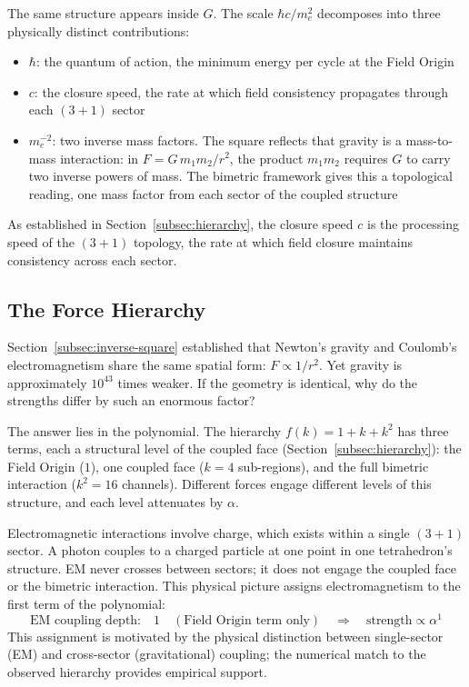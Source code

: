 \documentclass[aps,prd,preprint,superscriptaddress,showpacs,preprintnumbers,amsmath,amssymb,nofootinbib]{revtex4-2}
\begin{document}
The same structure appears inside $G$. The scale $\hbar c / m_e^2$ decomposes into three physically distinct contributions:
\begin{itemize}
\item $\hbar$: the quantum of action, the minimum energy per cycle at the Field Origin
\item $c$: the closure speed, the rate at which field consistency propagates through each $(3+1)$ sector
\item $m_e^{-2}$: two inverse mass factors. The square reflects that gravity is a mass-to-mass interaction: in $F = G\, m_1 m_2 / r^2$, the product $m_1 m_2$ requires $G$ to carry two inverse powers of mass. The bimetric framework gives this a topological reading, one mass factor from each sector of the coupled structure
\end{itemize}

As established in Section~\ref{subsec:hierarchy}, the closure speed $c$ is the processing speed of the $(3+1)$ topology, the rate at which field closure maintains consistency across each sector.

\subsection{The Force Hierarchy}
\label{subsec:hierarchy-eq}

Section~\ref{subsec:inverse-square} established that Newton's gravity and Coulomb's electromagnetism share the same spatial form: $F \propto 1/r^2$. Yet gravity is approximately $10^{43}$ times weaker. If the geometry is identical, why do the strengths differ by such an enormous factor?

The answer lies in the polynomial. The hierarchy $f(k) = 1 + k + k^2$ has three terms, each a structural level of the coupled face (Section~\ref{subsec:hierarchy}): the Field Origin ($1$), one coupled face ($k = 4$ sub-regions), and the full bimetric interaction ($k^2 = 16$ channels). Different forces engage different levels of this structure, and each level attenuates by $\alpha$.

Electromagnetic interactions involve charge, which exists within a single $(3+1)$ sector. A photon couples to a charged particle at one point in one tetrahedron's structure. EM never crosses between sectors; it does not engage the coupled face or the bimetric interaction. This physical picture assigns electromagnetism to the first term of the polynomial:
\begin{equation}
\text{EM coupling depth:} \quad 1 \quad (\text{Field Origin term only}) \quad \Rightarrow \quad \text{strength} \propto \alpha^{1}
\label{eq:em-depth}
\end{equation}
This assignment is motivated by the physical distinction between single-sector (EM) and cross-sector (gravitational) coupling; the numerical match to the observed hierarchy provides empirical support.
\end{document}

